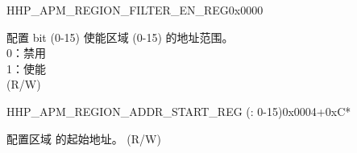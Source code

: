 \begin{register}{H}{HP\_APM\_REGION\_FILTER\_EN\_REG}{0x0000}\label{regdesc:HPAPMREGIONFILTERENREG}
%
%
\regnewline%
\begin{regdesc}\begin{reglist}
\label{fielddesc:HPAPMREGIONFILTEREN}\item [HP\_APM\_REGION\_FILTER\_EN] 配置 bit  (0-15) 使能区域  (0-15) 的地址范围。\\
0：禁用 \\
1：使能  \\ (R/W)
\end{reglist}\end{regdesc}
\end{register}

\begin{register}{H}{HP\_APM\_REGION\_ADDR\_START\_REG (: 0-15)}{0x0004+0xC*}\label{regdesc:HPAPMREGION0ADDRSTARTREG}
%
\regnewline%
\begin{regdesc}\begin{reglist}
\label{fielddesc:HPAPMREGION0ADDRSTART}\item [HP\_APM\_REGION\regindex{n}\_ADDR\_START] 配置区域  的起始地址。 (R/W)
\end{reglist}\end{regdesc}
\end{register}

